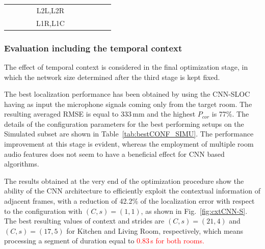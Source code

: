 \documentclass[review]{elsarticle}
\newcommand{\figref}[1]{Fig.~\ref{#1}}
\newcommand{\tableref}[1]{Table~\ref{#1}}
\begin{document}
\begin{table}[!h]
{\begin{tabular}{c|cc|cc|cc|cc|cc}
		&                                &                          &                                                                            & L2L,L2R               &                                         &                                             &                      &                      &                      &                     \\
		&                                &                          &                                                                            & L1R,L1C               &                                         &                                             &                      &                      &                      &                     \\
	\end{tabular}
	}
\end{table}

\subsubsection{Evaluation including the temporal context}


The effect of temporal context is considered in the final optimization stage, in which the network size determined after the third stage is kept fixed. %

The best localization performance has been obtained by using the CNN-SLOC having as input the microphone signals coming only from the target room. The resulting averaged RMSE is equal to 333\,mm and the highest $P_{cor}$ is 77\%. The details of the configuration parameters for the best performing setups on the Simulated subset are shown in \tableref{tab:bestCONF_SIMU}. The performance improvement at this stage is evident, whereas the employment of multiple room audio features does not seem to have a beneficial effect for CNN based algorithms. 

The results obtained at the very end of the optimization procedure show the ability of the CNN architecture to efficiently exploit the contextual information of adjacent frames, with a reduction of 42.2\% of the localization error with respect to the configuration with $(C,s)=(1,1)$, as shown in \figref{fig:cxtCNN-S}. 
The best resulting values of context and strides are $(C,s)=(21,4)$ and $(C,s)=(17,5)$ for Kitchen and Living Room, respectively, which means processing a segment of duration equal to \textcolor{red}{0.83\,s for both rooms.} 
\end{document}
